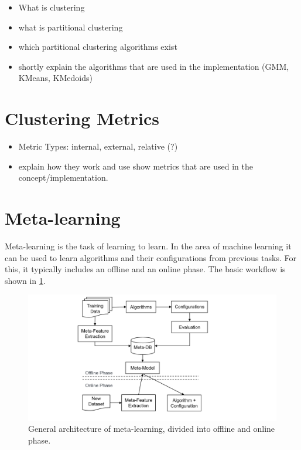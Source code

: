 \begin{itemize}
    \item What is clustering
    \item what is partitional clustering
    \item which partitional clustering algorithms exist
    \item shortly explain the algorithms that are used in the implementation (GMM, KMeans, KMedoids)
\end{itemize}

\section{Clustering Metrics}
\begin{itemize}

    \item Metric Types: internal, external, relative (?)
    \item explain how they work and use show metrics that are used in the concept/implementation.
\end{itemize}

\section{Meta-learning}

Meta-learning \cite{Brazdil2010MetalearningMining.} is the task of learning to learn.
In the area of machine learning it can be used to learn algorithms and their configurations from previous tasks.
For this, it typically includes an offline and an online phase.
The basic workflow is shown in \cref{fig:metalearningArch}.
\begin{figure}
    \centering
    \includegraphics[width=\textwidth]{graphics/metalearning_general_architecture.png}
    \caption{General architecture of meta-learning, divided into offline and online phase.}
    \label{fig:metalearningArch}
\end{figure}

